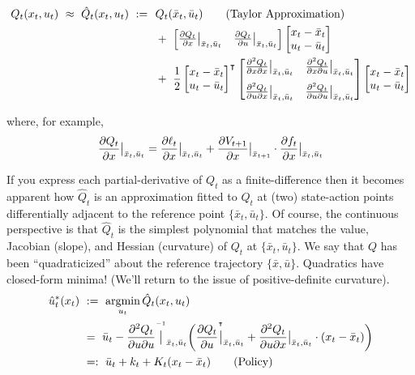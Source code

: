\documentclass{article}
\DeclareMathOperator*{\tr}{\intercal}
\DeclareMathOperator*{\argmin}{argmin}
\begin{document}
\begin{align*}
Q_t(x_t,u_t)\ \approx\ \hat{Q}_t(x_t,u_t)\ :=\ \ &Q_t(\bar{x}_t,\bar{u}_t) \tag{Taylor Approximation}\\
&+\ \begin{bmatrix}\frac{\partial Q_t}{\partial x}\big{|}_{\tiny{\bar{x}_t,\bar{u}_t}} & \frac{\partial Q_t}{\partial u}\big{|}_{\tiny{\bar{x}_t,\bar{u}_t}}\end{bmatrix} \begin{bmatrix}x_t - \bar{x}_t \\ u_t - \bar{u}_t\end{bmatrix}\\
&+\ \frac{1}{2}\begin{bmatrix}x_t - \bar{x}_t \\ u_t - \bar{u}_t\end{bmatrix}^{\tr} \begin{bmatrix}\frac{\partial^2 Q_t}{\partial x \partial x}\big{|}_{\tiny{\bar{x}_t,\bar{u}_t}} & \frac{\partial^2 Q_t}{\partial x \partial u}\big{|}_{\tiny{\bar{x}_t,\bar{u}_t}} \\[8pt] \frac{\partial^2 Q_t}{\partial u \partial x}\big{|}_{\tiny{\bar{x}_t,\bar{u}_t}} & \frac{\partial^2 Q_t}{\partial u \partial u}\big{|}_{\tiny{\bar{x}_t,\bar{u}_t}}\end{bmatrix} \begin{bmatrix}x_t - \bar{x}_t \\ u_t - \bar{u}_t\end{bmatrix}
\end{align*}

where, for example,
\begin{align*}
\frac{\partial Q_t}{\partial x}\big{|}_{\tiny{\bar{x}_t,\bar{u}_t}} = \frac{\partial \ell_t}{\partial x}\big{|}_{\tiny{\bar{x}_t,\bar{u}_t}} + \frac{\partial V_{t+1}}{\partial x}\big{|}_{\tiny{\bar{x}_{t+1}}} \cdot \frac{\partial f_t}{\partial x}\big{|}_{\tiny{\bar{x}_t,\bar{u}_t}}
\end{align*}

If you express each partial-derivative of $Q_t$ as a finite-difference then it becomes apparent how $\hat{Q}_t$ is an approximation fitted to $Q_t$ at (two) state-action points differentially adjacent to the reference point $\{\bar{x}_t,\bar{u}_t\}$. Of course, the continuous perspective is that $\hat{Q}_t$ is the simplest polynomial that matches the value, Jacobian (slope), and Hessian (curvature) of $Q_t$ at $\{\bar{x}_t,\bar{u}_t\}$. We say that $Q$ has been ``quadraticized'' about the reference trajectory $\{\bar{x},\bar{u}\}$. Quadratics have closed-form minima! (We'll return to the issue of positive-definite curvature).
\begin{align*}
\hat{u}^*_t(x_t)\ &:=\ \argmin_{u_t} \hat{Q}_t(x_t,u_t)\\
&=\ \bar{u}_t - \frac{\partial^2 Q_t}{\partial u \partial u}\overset{^{-1}}{\big{|}}_{\tiny{\bar{x}_t,\bar{u}_t}}\bigg{(}\frac{\partial Q_t}{\partial u}\overset{^{\tr}}{\big{|}}_{\tiny{\bar{x}_t,\bar{u}_t}} + \frac{\partial^2 Q_t}{\partial u \partial x}\big{|}_{\tiny{\bar{x}_t,\bar{u}_t}} \cdot (x_t - \bar{x}_t)\bigg{)}\\
&=:\ \bar{u}_t + k_t + K_t(x_t - \bar{x}_t)\tag{Policy}
\end{align*}
\end{document}
